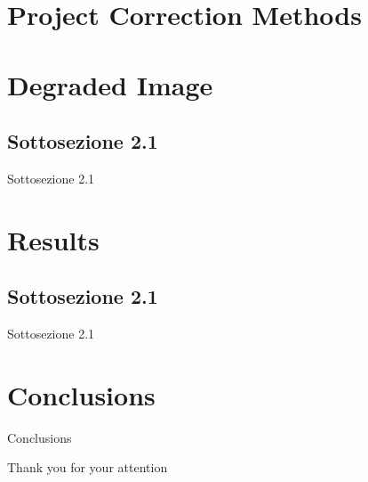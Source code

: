 \documentclass[11pt]{beamer}
\begin{document}
\section{Project Correction Methods}




\section{Degraded Image}
\subsection{Sottosezione 2.1}
\begin{frame}{Sottosezione 2.1}
\end{frame}

\section{Results}
\subsection{Sottosezione 2.1}
\begin{frame}{Sottosezione 2.1}
\end{frame}

\section{Conclusions}
\begin{frame}{Conclusions}
\end{frame}

\begin{frame}
  \centering
  {\Huge Thank you for your attention}
\end{frame}
\end{document}
